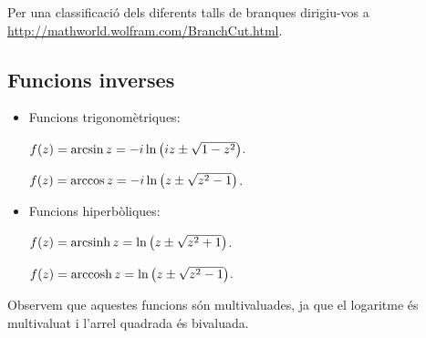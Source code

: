 Per una classificació dels diferents talls de branques dirigiu-vos a \url{http://mathworld.wolfram.com/BranchCut.html}.

\subsection{Funcions inverses}
\begin{itemize}
    \item Funcions trigonomètriques:
    
    $f(z) = \arcsin z = -i \ln \left( iz \pm \sqrt{1-z^{2}} \right)$.
    
    $f(z) = \arccos z = -i \ln \left( z \pm \sqrt{z^{2}-1} \right)$.
    \item Funcions hiperbòliques:
    
    $f(z) = \operatorname{arcsinh} z = \ln \left( z \pm \sqrt{z^{2} + 1} \right)$.
    
    $f(z) = \operatorname{arccosh} z = \ln \left( z \pm \sqrt{z^{2} - 1} \right)$.
\end{itemize}
Observem que aquestes funcions són multivaluades, ja que el logaritme és multivaluat i l'arrel quadrada és bivaluada.
